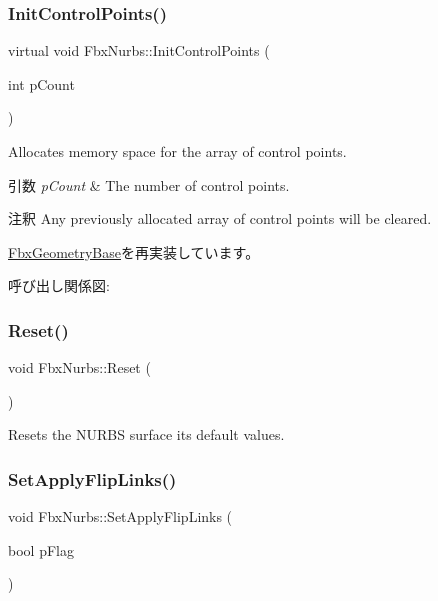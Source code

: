 \subsubsection{\texorpdfstring{Init\+Control\+Points()}{InitControlPoints()}\hspace{0.1cm}{\footnotesize\ttfamily [2/2]}}
{\footnotesize\ttfamily virtual void Fbx\+Nurbs\+::\+Init\+Control\+Points (\begin{DoxyParamCaption}\item[{int}]{p\+Count }\end{DoxyParamCaption})\hspace{0.3cm}{\ttfamily [virtual]}}

Allocates memory space for the array of control points. 
\begin{DoxyParams}{引数}
{\em p\+Count} & The number of control points. \\
\hline
\end{DoxyParams}
\begin{DoxyRemark}{注釈}
Any previously allocated array of control points will be cleared. 
\end{DoxyRemark}


\hyperlink{class_fbx_geometry_base_a471b736f2595c006a338c07a61907127}{Fbx\+Geometry\+Base}を再実装しています。

呼び出し関係図\+:
\mbox{\label{class_fbx_nurbs_a2796c708ff8e01b1fd7d1f4d0a02cb5f}} 
\subsubsection{\texorpdfstring{Reset()}{Reset()}}
{\footnotesize\ttfamily void Fbx\+Nurbs\+::\+Reset (\begin{DoxyParamCaption}{ }\end{DoxyParamCaption})}



Resets the N\+U\+R\+BS surface its default values. 

\mbox{\label{class_fbx_nurbs_a9e251f61538745bef6ebd5560f52a61f}} 
\subsubsection{\texorpdfstring{Set\+Apply\+Flip\+Links()}{SetApplyFlipLinks()}}
{\footnotesize\ttfamily void Fbx\+Nurbs\+::\+Set\+Apply\+Flip\+Links (\begin{DoxyParamCaption}\item[{bool}]{p\+Flag }\end{DoxyParamCaption})}

